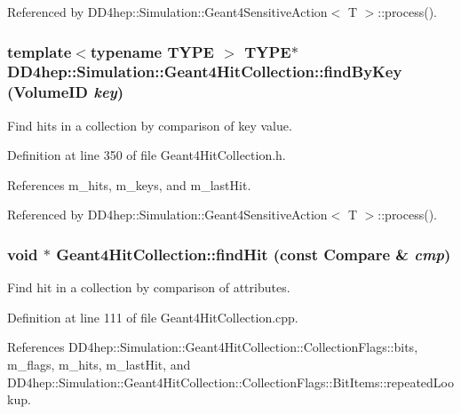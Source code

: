 Referenced by DD4hep::Simulation::Geant4SensitiveAction$<$ T $>$::process().\hypertarget{class_d_d4hep_1_1_simulation_1_1_geant4_hit_collection_acc76f5d25e9936860343b5457829426c}{
\subsubsection[{findByKey}]{\setlength{\rightskip}{0pt plus 5cm}template$<$typename TYPE $>$ TYPE$\ast$ DD4hep::Simulation::Geant4HitCollection::findByKey (VolumeID {\em key})}}
\label{class_d_d4hep_1_1_simulation_1_1_geant4_hit_collection_acc76f5d25e9936860343b5457829426c}


Find hits in a collection by comparison of key value. 

Definition at line 350 of file Geant4HitCollection.h.

References m\_\-hits, m\_\-keys, and m\_\-lastHit.

Referenced by DD4hep::Simulation::Geant4SensitiveAction$<$ T $>$::process().\hypertarget{class_d_d4hep_1_1_simulation_1_1_geant4_hit_collection_a4c854c0d590b4d453b2863933dfa31a1}{
\subsubsection[{findHit}]{\setlength{\rightskip}{0pt plus 5cm}void $\ast$ Geant4HitCollection::findHit (const {\bf Compare} \& {\em cmp})}}
\label{class_d_d4hep_1_1_simulation_1_1_geant4_hit_collection_a4c854c0d590b4d453b2863933dfa31a1}


Find hit in a collection by comparison of attributes. 

Definition at line 111 of file Geant4HitCollection.cpp.

References DD4hep::Simulation::Geant4HitCollection::CollectionFlags::bits, m\_\-flags, m\_\-hits, m\_\-lastHit, and DD4hep::Simulation::Geant4HitCollection::CollectionFlags::BitItems::repeatedLookup.

